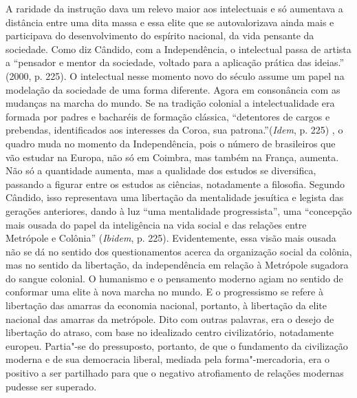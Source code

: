 {A raridade da instrução dava um relevo maior aos intelectuais e só
aumentava a distância entre uma dita massa e essa elite que se
autovalorizava ainda mais e participava do desenvolvimento do espírito
nacional, da vida pensante da sociedade. Como diz Cândido, com a
Independência, o intelectual passa de artista a ``pensador e mentor da
sociedade, voltado para a aplicação prática das ideias.'' (2000, p.
225). O intelectual nesse momento novo do século  assume um
papel na modelação da sociedade de uma forma diferente. Agora em
consonância com as mudanças na marcha do mundo. Se na tradição colonial
a intelectualidade era formada por padres e bacharéis de formação
clássica, ``detentores de cargos e prebendas, identificados aos
interesses da Coroa, sua patrona.''(\emph{Idem}, p. 225) , o quadro muda
no momento da Independência, pois o número de brasileiros que vão
estudar na Europa, não só em Coimbra, mas também na França, aumenta. Não
só a quantidade aumenta, mas a qualidade dos estudos se diversifica,
passando a figurar entre os estudos as ciências, notadamente a
filosofia. Segundo Cândido, isso representava uma libertação da
mentalidade jesuítica e legista das gerações anteriores, dando à luz
``uma mentalidade progressista'', uma ``concepção mais ousada do papel
da inteligência na vida social e das relações entre Metrópole e
Colônia'' (\emph{Ibidem}, p. 225). Evidentemente, essa visão mais ousada
não se dá no sentido dos questionamentos acerca da organização social da
colônia, mas no sentido da libertação, da independência em relação à
Metrópole sugadora do sangue colonial. O humanismo e o pensamento
moderno agiam no sentido de conformar uma elite à nova marcha no mundo.
E o progressismo se refere à libertação das amarras da economia
nacional, portanto, à libertação da elite nacional das amarras da
metrópole. Dito com outras palavras, era o desejo de libertação do
atraso, com base no idealizado centro civilizatório, notadamente
europeu. Partia"-se do pressuposto, portanto, de que o fundamento da
civilização moderna e de sua democracia liberal, mediada pela
forma"-mercadoria, era o positivo a ser partilhado para que o negativo
atrofiamento de relações modernas pudesse ser superado.

}
